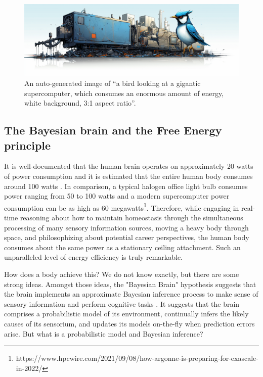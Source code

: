 \begin{figure}
  \centering
  \begin{tcolorbox}[width=\textwidth,arc=0pt,boxsep=0pt,left=0pt,right=0pt,top=0pt,bottom=0pt]
    \includegraphics[width=\linewidth]{contents/01-introduction/figs/01-bird.png}
  \end{tcolorbox}
  \caption{An auto-generated image of ``a bird looking at a gigantic supercomputer, which consumes an enormous amount of energy, white background, 3:1 aspect ratio''.}
  \label{fig:intro:bird}
\end{figure}

\subsection{The Bayesian brain and the Free Energy principle}

It is well-documented that the human brain operates on approximately 20 watts of power
consumption \citep{raichle_appraising_2002} and it is estimated that the entire human body
consumes around 100 watts \citep{kovac_20_2010}.
In comparison, a typical halogen office light bulb consumes power ranging from 50 to 100
watts and a modern supercomputer power consumption can be as high as 60 megawatts\footnote{https://www.hpcwire.com/2021/09/08/how-argonne-is-preparing-for-exascale-in-2022/}.
Therefore, while engaging in real-time reasoning about how to maintain homeostasis through the
simultaneous processing of many sensory information sources, moving a heavy body through
space, and philosophizing about potential career perspectives, the human body consumes about the
same power as a stationary ceiling attachment.
Such an unparalleled level of energy efficiency is truly remarkable.

How does a body achieve this?
We do not know exactly, but there are some strong ideas. 
Amongst those ideas, the "Bayesian Brain" hypothesis suggests that the brain implements an approximate Bayesian
inference process to make sense of sensory information and perform cognitive tasks
\citep{doya_bayesian_2006}.
It suggests that the brain comprises a probabilistic model of its environment, continually
infers the likely causes of its sensorium, and updates its models on-the-fly when
prediction errors arise. 
But what is a probabilistic model and Bayesian inference?


